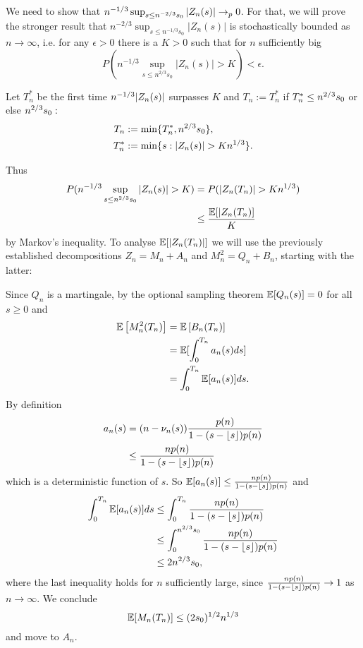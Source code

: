 

	
	We need to show that 
	$ n^{-1 / 3} \sup_{s \leq n^{-2 / 3} s_0} | Z_n(s) | \rightarrow_p 0 $.
	For that, we will prove the stronger result that 
	$ n^{-2/3} \sup_{s\leq n^{-1/3} s_0} |Z_n(s)| $ 
	is stochastically bounded as 
	$ n \rightarrow \infty $,
	i.e. for any 
	$ \epsilon > 0 $ 
	there is a
	$ K > 0 $
	such that for $n$ sufficiently big 
	$$ P\left( n^{-1/3} \sup_{s\leq n^{2/3} s_0} |Z_n(s)| > K \right) < \epsilon. $$
	
	Let
	$T^*_n$
	be the first time
	$n^{-1 / 3}|Z_n(s)|$
	surpasses $K$
	and 
	$T_n := T^*_n$ 
	if 
	$T^*_n \leq n^{2 / 3}s_0$
	or else
	$n^{2 / 3}s_0:$
	\begin{align*}
	T_n &:= \min \lbrace T^*_n, n^{2 / 3}s_0 \rbrace , \\
	T^*_n &:= \min \lbrace s: |Z_n(s)| > K n^{1 / 3} \rbrace .
	\end{align*}
	
	Thus 
	\begin{align*}
	P( n^{-1/3} \sup_{s\leq n^{2/3} s_0} |Z_n(s)| > K ) &= P ( |Z_n(T_n)| > Kn^{1 / 3} ) \\
	&\leq \frac{\mathbb{E}[|Z_n(T_n)]}{K}
	\end{align*} 
	by Markov's inequality.
	To analyse
	$ \mathbb{E}[|Z_n(T_n)|] $
	we will use the previously established decompositions
	$Z_n = M_n + A_n$
	and
	$M^2_n = Q_n + B_n$, 
	starting with the latter:
	
	Since $Q_n$ is a martingale, by the optional sampling theorem
	$\mathbb{E}[Q_n(s)] = 0$ 
	for all
	$s \geq 0$
	and
	\begin{align*}
	\mathbb{E} \left[ M^2_n(T_n) \right] &= \mathbb{E} \left[ B_n(T_n) \right] \\
	&= \mathbb{E}[ \int_{0}^{T_n} a_n(s)ds ] \\
	&= \int_{0}^{T_n} \mathbb{E}[a_n(s)] ds.
	\end{align*} 
	By definition
	\begin{align*}
	 a_n(s) &= (n - \nu_n(s)) \frac{p(n)}{1 - (s - \lfloor s\rfloor)p(n)} \\
	 &\leq \frac{n p(n)}{1 - (s - \lfloor s\rfloor)p(n)}
	\end{align*}
	which is a deterministic function of $s$. So
	$ \mathbb{E}[a_n(s)] \leq \frac{n p(n)}{1 - (s - \lfloor s\rfloor)p(n)} $
	and
	\begin{align*}
	\int_{0}^{T_n} \mathbb{E}[a_n(s)] ds &\leq  \int_{0}^{T_n }\frac{n p(n)}{1 - (s - \lfloor s\rfloor)p(n)} \\
	&\leq \int_{0}^{n^{2 / 3}s_0}\frac{n p(n)}{1 - (s - \lfloor s\rfloor)p(n)} \\
	&\leq 2n^{2 / 3}s_0,
	\end{align*}
	where the last inequality holds for $n$ sufficiently large, since 
	$\frac{n p(n)}{1 - (s - \lfloor s\rfloor)p(n)} \rightarrow 1$
	as
	$n \rightarrow \infty$.
	We conclude
	\begin{equation}
	\mathbb{E}[M_n(T_n)] \leq (2s_0)^{1/2}n^{1 / 3}
	\end{equation}
	and move to $A_n$.
	
	
	
	
	
